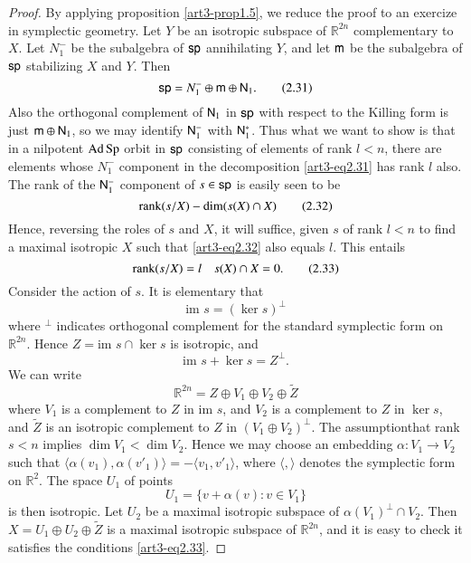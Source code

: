 \begin{proof}
By applying proposition \ref{art3-prop1.5}, we reduce the proof to an exercize in symplectic geometry. Let $Y$ be an isotropic subspace of $\mathbb{R}^{2n}$ complementary to $X$. Let $N^{-}_{1}$ be the subalgebra of $\mathsf{s}\mathsf{p}$ annihilating $Y$, and let $\mathsf{m}$ be the subalgebra of $\mathsf{s}\mathsf{p}$ stabilizing $X$ and $Y$. Then
\begin{equation*}
\mathsf{s}\mathsf{p}=N^{-}_{1}\oplus \mathsf{m} \oplus \mathsf{N}_{1}.\tag{2.31}\label{art3-eq2.31}
\end{equation*}
Also the orthogonal complement of $\mathsf{N}_{1}$ in $\mathsf{s}\mathsf{p}$ with respect to the Killing form is just $\mathsf{m}\oplus \mathsf{N}_{1}$, so we may identify $\mathsf{N}^{-}_{1}$ with $\mathsf{N}^{*}_{1}$. Thus what we want to show is that in a nilpotent $\operatorname{Ad} \operatorname{Sp}$ orbit in $\mathsf{s}\mathsf{p}$ consisting of elements of rank $l<n$, there are elements whose $N^{-}_{1}$ component in the decomposition \eqref{art3-eq2.31} has rank $l$ also. The rank of the $\mathsf{N}^{-}_{1}$ component of $s\in \mathsf{s}\mathsf{p}$ is easily seen to be
\begin{equation*}
\operatorname{rank} (s/X)-\dim (s(X)\cap X)\tag{2.32}\label{art3-eq2.32}
\end{equation*}
Hence, reversing the roles of $s$ and $X$, it will suffice, given $s$ of rank $l<n$ to find a maximal isotropic $X$ such that \eqref{art3-eq2.32} also equals $l$. This entails
\begin{equation*}
\operatorname{rank} (s/X)=l\quad s(X)\cap X=0.\tag{2.33}\label{art3-eq2.33}
\end{equation*}
Consider the action of $s$. It is elementary that
$$
\text{im~}s=(\ker s)^{\perp}
$$
where $^{\perp}$ indicates orthogonal complement for the standard symplectic form on $\mathbb{R}^{2n}$. Hence $Z=\text{im~}s\cap\ker s$ is isotropic, and
$$
\text{im~}s+\ker s=Z^{\perp}.
$$
We can write
$$
\mathbb{R}^{2n}=Z\oplus V_{1}\oplus V_{2}\oplus \widetilde{Z}
$$
where $V_{1}$ is a complement to $Z$ in im $s$, and $V_{2}$ is a complement to $Z$ in $\ker s$, and $\widetilde{Z}$ is an isotropic complement to $Z$ in $(V_{1}\oplus V_{2})^{\perp}$. The assumption\pageoriginale that rank $s<n$ implies $\dim V_{1}<\dim V_{2}$. Hence we may choose an embedding $\alpha:V_{1}\to V_{2}$ such that $\langle \alpha(v_{1}),\alpha(v'_{1})\rangle=-\langle v_{1},v'_{1}\rangle$, where $\langle ,\rangle$ denotes the symplectic form on $\mathbb{R}^{2}$. The space $U_{1}$ of points
$$
U_{1}=\{v+\alpha(v):v\in V_{1}\}
$$
is then isotropic. Let $U_{2}$ be a maximal isotropic subspace of $\alpha(V_{1})^{\perp}\cap V_{2}$. Then $X=U_{1}\oplus U_{2}\oplus \widetilde{Z}$ is a maximal isotropic subspace of $\mathbb{R}^{2n}$, and it is easy to check it satisfies the conditions \eqref{art3-eq2.33}.


\end{proof}
